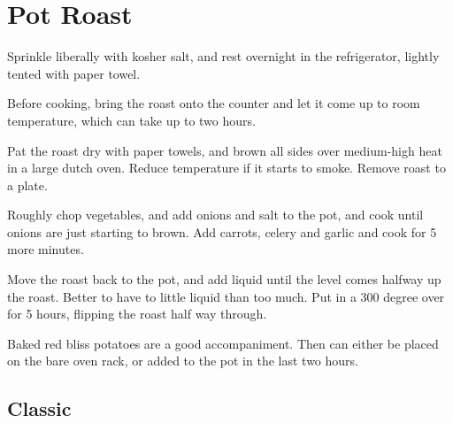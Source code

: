 

\section{Pot Roast}
\begin{recipe}



Sprinkle liberally with kosher salt, and rest overnight in the refrigerator, lightly tented with paper towel.

Before cooking, bring the roast onto the counter and let it come up to room temperature, which can take up to two hours.

Pat the roast dry with paper towels, and brown all sides over medium-high heat in a large dutch oven. Reduce temperature if it starts to smoke. Remove roast to a plate.


Roughly chop vegetables, and add onions and salt to the pot, and cook until onions are just starting to brown. Add carrots, celery and garlic and cook for 5 more minutes.

Move the roast back to the pot, and add liquid until the level comes halfway up the roast. Better to have to little liquid than too much. Put in a 300 degree over for 5 hours, flipping the roast half way through.

Baked red bliss potatoes are a good accompaniment. Then can either be placed on the bare oven rack, or added to the pot in the last two hours.

\subsection{Classic}




\end{recipe}
